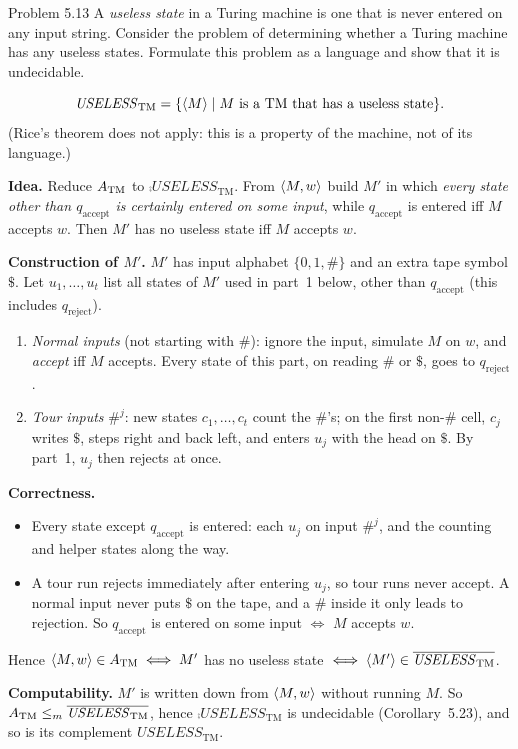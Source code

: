 \begin{question}{Problem 5.13}
A \emph{useless state} in a Turing machine is one that is never entered on any input string. Consider the problem of determining whether a Turing machine has any useless states. Formulate this problem as a language and show that it is undecidable.
\end{question}
\begin{soln}
\[
\mathit{USELESS}_{\mathrm{TM}}=\{\langle M\rangle\mid M\text{ is a TM that has a useless state}\}.
\]
(Rice's theorem does not apply: this is a property of the machine, not of its language.)

\textbf{Idea.} Reduce $A_{\mathrm{TM}}$ to $\comp{\mathit{USELESS}_{\mathrm{TM}}}$. From $\langle M,w\rangle$ build $M'$ in which \emph{every state other than $q_{\mathrm{accept}}$ is certainly entered on some input}, while $q_{\mathrm{accept}}$ is entered iff $M$ accepts $w$. Then $M'$ has no useless state iff $M$ accepts $w$.

\textbf{Construction of $M'$.} $M'$ has input alphabet $\{0,1,\#\}$ and an extra tape symbol $\$$. Let $u_1,\dots,u_t$ list all states of $M'$ used in part~1 below, other than $q_{\mathrm{accept}}$ (this includes $q_{\mathrm{reject}}$).
\begin{enumerate}
\item \emph{Normal inputs} (not starting with $\#$): ignore the input, simulate $M$ on $w$, and \emph{accept} iff $M$ accepts. Every state of this part, on reading $\#$ or $\$$, goes to $q_{\mathrm{reject}}$.
\item \emph{Tour inputs} $\#^j$: new states $c_1,\dots,c_t$ count the $\#$'s; on the first non-$\#$ cell, $c_j$ writes $\$$, steps right and back left, and enters $u_j$ with the head on $\$$. By part~1, $u_j$ then rejects at once.
\end{enumerate}

\textbf{Correctness.}
\begin{itemize}
\item Every state except $q_{\mathrm{accept}}$ is entered: each $u_j$ on input $\#^j$, and the counting and helper states along the way.
\item A tour run rejects immediately after entering $u_j$, so tour runs never accept. A normal input never puts $\$$ on the tape, and a $\#$ inside it only leads to rejection. So $q_{\mathrm{accept}}$ is entered on some input $\iff$ $M$ accepts $w$.
\end{itemize}
Hence $\langle M,w\rangle\in A_{\mathrm{TM}}\iff M'$ has no useless state $\iff\langle M'\rangle\in\overline{\mathit{USELESS}_{\mathrm{TM}}}$.

\textbf{Computability.} $M'$ is written down from $\langle M,w\rangle$ without running $M$. So $A_{\mathrm{TM}}\le_{m}\overline{\mathit{USELESS}_{\mathrm{TM}}}$, hence $\comp{\mathit{USELESS}_{\mathrm{TM}}}$ is undecidable (Corollary~5.23), and so is its complement $\mathit{USELESS}_{\mathrm{TM}}$.
\end{soln}

